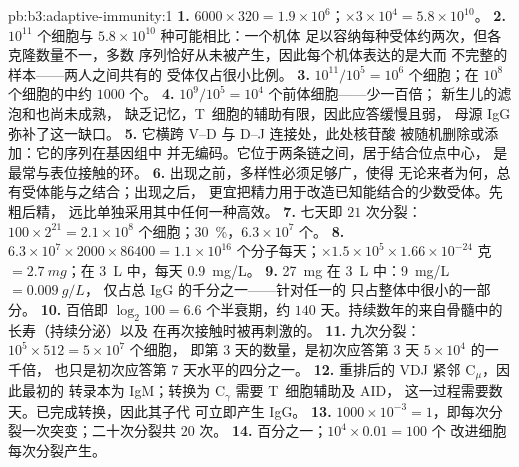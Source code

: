 \begin{solution}{pb:b3:adaptive-immunity:1}
\textbf{1.} $6000\times 320 = 1.9\times 10^{6}$；$\times 3\times 10^{4}
= 5.8\times 10^{10}$。
\textbf{2.} $10^{11}$ 个细胞与 $5.8\times 10^{10}$ 种可能相比：一个机体
足以容纳每种受体约两次，但各克隆数量不一，多数
序列恰好从未被产生，因此每个机体表达的是大而
不完整的样本——两人之间共有的
受体仅占很小比例。
\textbf{3.} $10^{11}/10^{5} = 10^{6}$ 个细胞；在 $10^{8}$
个细胞的中约 $1000$ 个。
\textbf{4.} $10^{9}/10^{5} = 10^{4}$ 个前体细胞——少一百倍；
新生儿的滤泡和也尚未成熟，
缺乏记忆，T~细胞的辅助有限，因此应答缓慢且弱，
母源 IgG 弥补了这一缺口。
\textbf{5.} 它横跨 V--D 与 D--J 连接处，此处核苷酸
被随机删除或添加：它的序列在基因组中
并无编码。它位于两条链之间，居于结合位点中心，
是最常与表位接触的环。
\textbf{6.} 出现之前，多样性必须足够广，使得
无论来者为何，总有受体能与之结合；出现之后，
更宜把精力用于改造已知能结合的少数受体。先粗后精，
远比单独采用其中任何一种高效。
\textbf{7.} 七天即 $21$ 次分裂：$100\times 2^{21} = 2.1\times
10^{8}$ 个细胞；\qty{30}{\%}，$6.3\times 10^{7}$ 个。
\textbf{8.} $6.3\times 10^{7}\times 2000\times \num{86400} = 1.1\times
10^{16}$ 个分子每天；$\times 1.5\times 10^{5}\times 1.66\times
10^{-24}$ 克 $= \qty{2.7}{mg}$；在 \qty{3}{L} 中，每天 \qty{0.9}{mg/L}。
\textbf{9.} \qty{27}{mg} 在 \qty{3}{L} 中：\qty{9}{mg/L} $= \qty{0.009}{g/L}$，
仅占总 IgG 的千分之一——针对任一的
只占整体中很小的一部分。
\textbf{10.} 百倍即 $\log_{2}100 = 6.6$ 个半衰期，约
$140$ 天。持续数年的来自骨髓中的
长寿（持续分泌）以及
在再次接触时被再刺激的。
\textbf{11.} 九次分裂：$10^{5}\times 512 = 5\times 10^{7}$ 个细胞，
即第 3 天的数量，是初次应答第 3 天 $5\times 10^{4}$ 的一千倍，
也只是初次应答第 7 天水平的四分之一。
\textbf{12.} 重排后的 VDJ 紧邻 C$_{\mu}$，因此最初的
转录本为 IgM；转换为 C$_{\gamma}$ 需要 T~细胞辅助及 AID，
这一过程需要数天。已完成转换，因此其子代
可立即产生 IgG。
\textbf{13.} $1000\times 10^{-3} = 1$，即每次分裂一次突变；二十次分裂共 $20$ 次。
\textbf{14.} 百分之一；$10^{4}\times 0.01 = 100$ 个
改进细胞每次分裂产生。

\end{solution}
